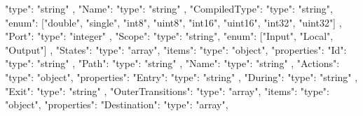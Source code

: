 \documentclass{article}
\begin{document}
{{{{{{{{{                                "type": "string"
                            }, 
                            "Name":{
                                "type": "string"
                            },
                            "CompiledType":{
                                "type": "string",
                                "enum": ["double", "single", "int8", "uint8", 
                                            "int16", "uint16", "int32", "uint32"]                    
                            },
                            "Port":{
                                "type": "integer"
                            },                  
                            "Scope":{
                                "type": "string",
                                "enum": ["Input", "Local", "Output"]                    
                            }                                                                                 
                        }
                    }
                },         
                "States": {
                    "type": "array",
                    "items": {
                        "type": "object",
                        "properties": {
                            "Id":{
                                "type": "string"
                            }, 
                            "Path":{
                                "type": "string"
                            },
                            "Name":{
                                "type": "string"
                            },                    
                            "Actions":{
                                "type": "object",
                                "properties": {
                                    "Entry": {
                                        "type": "string"
                                    },
                                    "During": {
                                        "type": "string"
                                    },
                                    "Exit": {
                                        "type": "string"
                                    }                                                        
                                }                  
                            },
                            "OuterTransitions":{
                                "type": "array",
                                "items": {
                                    "type": "object",
                                    "properties": {
                                        "Destination":{
                                            "type": "array",
}}}}}}}}}}}}
\end{document}
